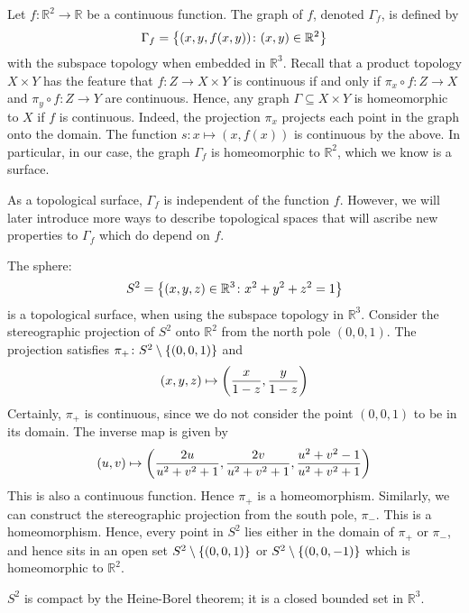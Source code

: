 \begin{example}
	Let \( f \colon \mathbb R^2 \to \mathbb R \) be a continuous function.
	The graph of \( f \), denoted \( \Gamma_f \), is defined by
	\[
		\Gamma_f = \qty{(x,y,f(x,y)) \colon (x,y) \in \mathbb R^2}
	\]
	with the subspace topology when embedded in \( \mathbb R^3 \).
	Recall that a product topology \( X \times Y \) has the feature that \( f \colon Z \to X \times Y \) is continuous if and only if \( \pi_x \circ f \colon Z \to X \) and \( \pi_y \circ f \colon Z \to Y \) are continuous.
	Hence, any graph \( \Gamma \subseteq X \times Y \) is homeomorphic to \( X \) if \( f \) is continuous.
	Indeed, the projection \( \pi_x \) projects each point in the graph onto the domain.
	The function \( s \colon x \mapsto (x,f(x)) \) is continuous by the above.
	In particular, in our case, the graph \( \Gamma_f \) is homeomorphic to \( \mathbb R^2 \), which we know is a surface.
\end{example}
\begin{remark}
	As a topological surface, \( \Gamma_f \) is independent of the function \( f \).
	However, we will later introduce more ways to describe topological spaces that will ascribe new properties to \( \Gamma_f \) which do depend on \( f \).
\end{remark}
\begin{example}
	The sphere:
	\[
		S^2 = \qty{(x,y,z) \in \mathbb R^3 \colon x^2 + y^2 + z^2 = 1}
	\]
	is a topological surface, when using the subspace topology in \( \mathbb R^3 \).
	Consider the stereographic projection of \( S^2 \) onto \( \mathbb R^2 \) from the north pole \( (0,0,1) \).
	The projection satisfies \( \pi_+ \colon S^2 \setminus \qty{(0,0,1)} \) and
	\[
		(x,y,z) \mapsto \qty(\frac{x}{1-z}, \frac{y}{1-z})
	\]
	Certainly, \( \pi_+ \) is continuous, since we do not consider the point \( (0,0,1) \) to be in its domain.
	The inverse map is given by
	\[
		(u,v) \mapsto \qty(\frac{2u}{u^2+v^2+1}, \frac{2v}{u^2+v^2+1}, \frac{u^2+v^2-1}{u^2+v^2+1})
	\]
	This is also a continuous function.
	Hence \( \pi_+ \) is a homeomorphism.
	Similarly, we can construct the stereographic projection from the south pole, \( \pi_- \).
	This is a homeomorphism.
	Hence, every point in \( S^2 \) lies either in the domain of \( \pi_+ \) or \( \pi_- \), and hence sits in an open set \( S^2 \setminus \qty{(0,0,1)} \) or \( S^2 \setminus \qty{(0,0,-1)} \) which is homeomorphic to \( \mathbb R^2 \).
\end{example}
\begin{remark}
	\( S^2 \) is compact by the Heine-Borel theorem; it is a closed bounded set in \( \mathbb R^3 \).
\end{remark}
